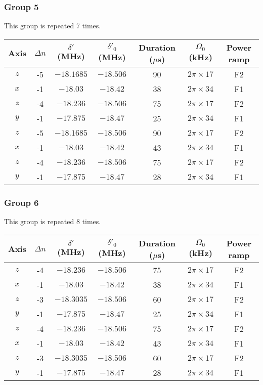 \documentclass[aps,secnumarabic,amsmath,amssymb]{revtex4}
\begin{document}
\subsubsection{Group 5}
This group is repeated 7 times.
\begin{center}
  \begin{tabular}{|c|c|c|c|c|c|c|}
    \hline
    Axis&$\Delta n$&$\delta'$ (MHz)&$\delta'_0$ (MHz)&Duration ($\mu$s)& $\Omega_0$ (kHz)&Power ramp\\\hline
    $z$&-5&$-18.1685$&$-18.506$&90&$2\pi\times17$&F2\\\hline
    $x$&-1&$-18.03$&$-18.42$&38&$2\pi\times34$&F1\\\hline
    $z$&-4&$-18.236$&$-18.506$&75&$2\pi\times17$&F2\\\hline
    $y$&-1&$-17.875$&$-18.47$&25&$2\pi\times34$&F1\\\hline
    $z$&-5&$-18.1685$&$-18.506$&90&$2\pi\times17$&F2\\\hline
    $x$&-1&$-18.03$&$-18.42$&43&$2\pi\times34$&F1\\\hline
    $z$&-4&$-18.236$&$-18.506$&75&$2\pi\times17$&F2\\\hline
    $y$&-1&$-17.875$&$-18.47$&28&$2\pi\times34$&F1\\\hline
  \end{tabular}
\end{center}
\subsubsection{Group 6}
This group is repeated 8 times.
\begin{center}
  \begin{tabular}{|c|c|c|c|c|c|c|}
    \hline
    Axis&$\Delta n$&$\delta'$ (MHz)&$\delta'_0$ (MHz)&Duration ($\mu$s)& $\Omega_0$ (kHz)&Power ramp\\\hline
    $z$&-4&$-18.236$&$-18.506$&75&$2\pi\times17$&F2\\\hline
    $x$&-1&$-18.03$&$-18.42$&38&$2\pi\times34$&F1\\\hline
    $z$&-3&$-18.3035$&$-18.506$&60&$2\pi\times17$&F2\\\hline
    $y$&-1&$-17.875$&$-18.47$&25&$2\pi\times34$&F1\\\hline
    $z$&-4&$-18.236$&$-18.506$&75&$2\pi\times17$&F2\\\hline
    $x$&-1&$-18.03$&$-18.42$&43&$2\pi\times34$&F1\\\hline
    $z$&-3&$-18.3035$&$-18.506$&60&$2\pi\times17$&F2\\\hline
    $y$&-1&$-17.875$&$-18.47$&28&$2\pi\times34$&F1\\\hline
  \end{tabular}
\end{center}
\end{document}
